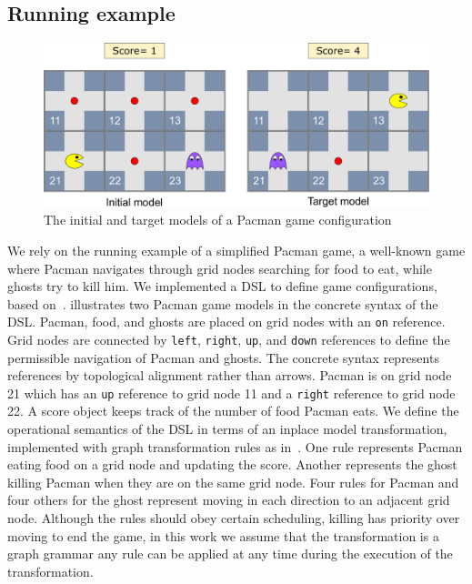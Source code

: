 \subsection{Running example}\label{sec:example}

\begin{figure}
    \centering
    \includegraphics[width=.8\linewidth]{images/pacman_example}
    \caption{The initial and target models of a Pacman game configuration}
    \label{fig:example}
\end{figure}
%
We rely on the running example of a simplified Pacman game, a well-known game where Pacman navigates through grid nodes searching for food to eat, while ghosts try to kill him.
We implemented a DSL to define game configurations, based on~\cite{Syriani2013a}.
 illustrates two Pacman game models in the concrete syntax of the DSL.
Pacman, food, and ghosts are placed on grid nodes with an \texttt{on} reference.
Grid nodes are connected by \texttt{left}, \texttt{right}, \texttt{up}, and \texttt{down} references to define the permissible navigation of Pacman and ghosts.
The concrete syntax represents references by topological alignment rather than arrows.
Pacman is on grid node 21 which has an \texttt{up} reference to grid node 11 and a \texttt{right} reference to grid node 22.
A score object keeps track of the number of food Pacman eats.
We define the operational semantics of the DSL in terms of an inplace model transformation, implemented with graph transformation rules as in~\cite{Syriani2013a}.
One rule represents Pacman eating food on a grid node and updating the score.
Another represents the ghost killing Pacman when they are on the same grid node.
Four rules for Pacman and four others for the ghost represent moving in each direction to an adjacent grid node.
Although the rules should obey certain scheduling, \eg killing has priority over moving to end the game, in this work we assume that the transformation is a graph grammar \ie any rule can be applied at any time during the execution of the transformation.


